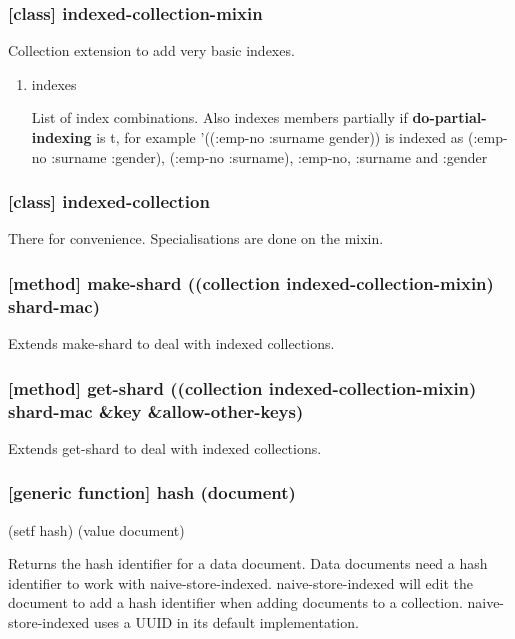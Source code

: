 \documentclass[11pt]{article}
\begin{document}
\subsubsection{[class] indexed-collection-mixin}
\label{sec:org520e2a2}

Collection extension to add very basic indexes.

\begin{enumerate}
\item\relax [accessor] indexes
\label{sec:org06416bf}

List of index combinations. Also indexes members partially if
\textbf{do-partial-indexing} is t, for example '((:emp-no :surname gender))
is indexed as (:emp-no :surname :gender), (:emp-no :surname), :emp-no,
:surname and :gender
\end{enumerate}

\subsubsection{[class] indexed-collection}
\label{sec:org7575d20}

There for convenience. Specialisations are done on the mixin.

\subsubsection{[method] make-shard ((collection indexed-collection-mixin) shard-mac)}
\label{sec:org1b8c710}

Extends make-shard to deal with indexed collections.

\subsubsection{[method] get-shard ((collection indexed-collection-mixin) shard-mac \&key \&allow-other-keys)}
\label{sec:orgff71b50}

Extends get-shard to deal with indexed collections.

\subsubsection{[generic function] hash (document)}
\label{sec:orgeec551d}

(setf hash) (value document)

Returns the hash identifier for a data document. Data documents need a
hash identifier to work with naive-store-indexed. naive-store-indexed
will edit the document to add a hash identifier when adding documents
to a collection. naive-store-indexed uses a UUID in its default
implementation.
\end{document}
